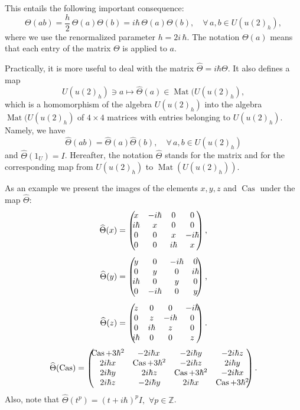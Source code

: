 \documentclass[11pt]{article}
\DeclareMathOperator{\Cas}{Cas}
\newcommand{\hh}{\hbar}
\newcommand{\hatt}{\widehat{\Theta}}
\DeclareMathOperator{\Mat}{Mat}
\numberwithin{equation}{section}
\theoremstyle{plain}
\theoremstyle{definition}
\begin{document}
This entails the following important consequence:
\[
{\Theta}(ab)=\frac{h}{2} \,{\Theta}(a){\Theta}(b)=i\hh\, {\Theta}(a){\Theta}(b),\quad \forall\, a,b \in U(u(2)_h),
\]
where we use  the renormalized parameter $h = 2i\,\hh$. The notation ${\Theta}(a)$ means that each entry of the
matrix $\Theta$ is applied to $a$.

Practically, it is more useful to deal with the matrix  $\hatt=i\hh \Theta$. It also defines a map
\[
U(u(2)_h) \ni a \mapsto \hatt(a)\in {\Mat}(U(u(2)_h),
\]
which is a homomorphism of the algebra $U(u(2)_h)$ into the algebra ${\Mat}(U(u(2)_h)$ of $4\times 4$ matrices
with entries belonging to $U(u(2)_h)$. Namely, we have
\begin{equation}
{\hatt}(ab)={\hatt}(a){\hatt}(b),\quad \forall \,a,b \in U(u(2)_h)
\label{The}
\end{equation}
and $\hatt(1_U)=I$. Hereafter, the notation $\hatt$ stands  for the matrix and for the corresponding map
from $U(u(2)_h)$ to ${\Mat}(U(u(2)_h))$.

As an example we present the images of the elements $x,y,z$ and $\Cas$ under the map $\hatt$:
\begin{align}
{\hatt}(x)&=
\left(\!\!\begin{array}{@{}cccc@{}}
 x&-i\hh&0&0\\
 i\hh&x&0&0\\
 0&0&x&-i\hh\\
 0&0&i\hh&x
\end{array}\!\!\right), \notag\\[1ex]
{\hatt}(y)&=
\left(\!\!\begin{array}{@{}cccc@{}}
 y&0&-i\hh&0\\
 0&y&0&i\hh\\
 i\hh&0&y&0\\
 0&-i\hh&0&y
\end{array}\!\!\right), \notag\\[1ex]
{\hatt}(z)&=
\left(\!\!\begin{array}{@{}cccc@{}}
 z&0&0&-i\hh\\
 0&z&-i\hh&0\\
 0&i\hh&z&0\\
 i\hh&0&0&z
\end{array}\!\!\right).
\end{align}
\begin{equation}
{\hatt}(\Cas)=
\left(\!\!
\begin{array}{@{}cccc@{}}
	\Cas+3\hh^2 &   \displaystyle -2i\hh x\,& \displaystyle -2i\hh y &\displaystyle -2i\hh z\\
	\displaystyle  2i\hh x&\Cas+3\hh^2&\displaystyle -2i\hh z &\displaystyle 2i\hh y \\
	\displaystyle 2i\hh y &\displaystyle 2i\hh z &\Cas+3\hh^2 &\displaystyle -2i\hh x\\
	\displaystyle 2i\hh z &\displaystyle -2i\hh y & \displaystyle 2i\hh x&\Cas+3\hh^2
\end{array}
\!\!\right).
\end{equation}
Also, note that  $\hatt(t^p)=(t+i\hh)^p I,\,\, \forall p\in \mathbb{Z }$.
\end{document}
